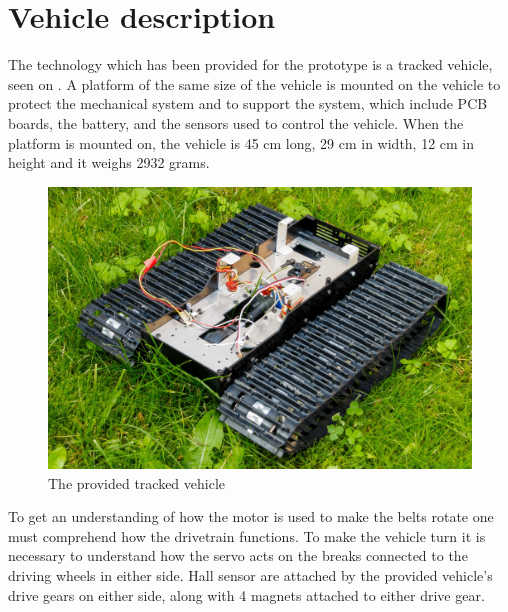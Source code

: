 \section{Vehicle description}
\label{sec:Vehicledescription}
The technology which has been provided for the prototype is a tracked vehicle, seen on . A platform of the same size of the vehicle  is mounted on the vehicle to protect the mechanical system and to support the system, which include PCB boards, the battery, and the sensors used to control the vehicle. When the platform is mounted on, the vehicle is 45 cm long, 29 cm in width, 12 cm in height and it weighs 2932 grams.\\
%
\begin{figure}[H]
	\centering
	\includegraphics[scale=0.6]{figures/BeltVehicle.jpg}
	\caption{The provided tracked vehicle}
	\label{TrackedVehicle}
\end{figure}
%
To get an understanding of how the motor is used to make the belts rotate one must comprehend how the drivetrain functions. To make the vehicle turn it is necessary to understand how the servo acts on the breaks connected to the driving wheels in either side. Hall sensor are attached by the provided vehicle's drive gears on either side, along with 4 magnets attached to either drive gear.